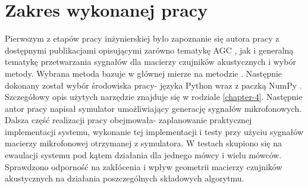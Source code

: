 \section{Zakres wykonanej pracy}
Pierwszym z etapów pracy inżynierskiej było zapoznanie się autora pracy z dostępnymi publikacjami opisującymi zarówno tematykę AGC \cite{Braun2014}, \cite{Archibald2008} jak i generalną tematykę przetwarzania sygnałów dla macierzy czujników akustycznych \cite{Benesty2008} i wybór metody. Wybrana metoda bazuje w głównej mierze na metodzie \cite{Braun2014}.
Następnie dokonany został wybór środowiska pracy- języka Python wraz z paczką NumPy \cite{numpy}. Szczegółowy opis użytych narzędzie znajduje się w rodziale \ref{chapter-4}. Następnie autor pracy napisał symulator umożliwiający generację sygnałów mikrofonowych. Dalsza część realizacji pracy obejmowała- zaplanowanie praktycznej implementacji systemu, wykonanie tej implementacji i testy przy użyciu sygnałów macierzy mikrofonowej otrzymanej z symulatora. W testach skupiono się na ewaulacji systemu pod kątem działania dla jednego mówcy i wielu mówców. Sprawdzono odporność na zakłócenia i wpływ geometrii macierzy czujników akustycznych na działania poszczególnych składowych algorytmu.

